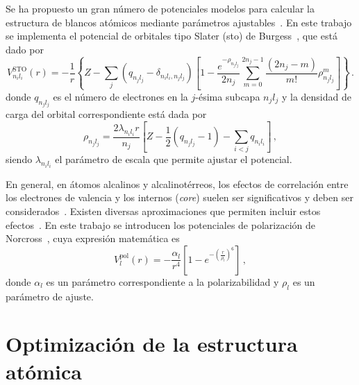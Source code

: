 Se ha propuesto un gran número de potenciales modelos para calcular la 
estructura de blancos atómicos mediante parámetros 
ajustables~\cite{Hibbert:82,Gombas:56,Green:69,Klapisch:71,Phillips:59,
Herman:63,Dalgarno:70,Bayliss:77,Cowan:76,Lee:77}. 
En este trabajo se implementa el potencial de orbitales tipo Slater 
(\acs{sto}) de Burgess~\cite{Burgess:89}, que está dado por
\begin{equation}
V_{n_il_i}^{\textrm{STO}}(r)=-\frac{1}{r}\left\{Z-\sum_j(q_{n_jl_j}-
\delta_{n_il_i,n_jl_j})
\left[1-\frac{e^{-\rho_{n_jl_j}}}{2n_j}\sum_{m=0}^{2n_j-1}
\frac{(2n_j-m)}{m!}\rho_{n_jl_j}^m\right]\right\}\,.
\label{eq:STO-pot}
\end{equation}
donde $q_{n_jl_j}$ es el número de electrones en la $j$-ésima subcapa 
$n_jl_j$ y la densidad de carga del orbital correspondiente está dada 
por
\begin{equation}
\rho_{n_jl_j}= \frac{2\lambda_{n_il_i}r}{n_j}\left[Z-
\frac{1}{2}\left(q_{n_jl_j}-1\right)-\sum_{i<j} q_{n_il_i}\right]\,,
\end{equation}
siendo $\lambda_{n_il_i}$ el parámetro de escala que permite ajustar el 
potencial. 

En general, en átomos alcalinos y alcalinotérreos, los efectos de 
correlación entre los electrones de valencia y los internos 
(\textit{core}) suelen ser significativos y deben ser 
considerados~\cite{Bartschat:04,Muller:83}. Existen diversas 
aproximaciones que permiten incluir estos efectos~\cite{Loughlin:88,
Seaton:72,Loughlin:73,Migdalek:78}. En este trabajo se introducen los
potenciales de polarización de Norcross~\cite{Norcross:76}, cuya 
expresión matemática es
\begin{equation}
 V_l^{\textrm{pol}}(r) = -\frac{\alpha_l}{r^4}\left[1-
e^{-\left(\tfrac{r}{\rho_l}\right)^6}\right]\,,
\label{eq:Norcross-pot}
\end{equation}
donde $\alpha_l$ es un parámetro correspondiente a la polarizabilidad y 
$\rho_l$ es un parámetro de ajuste.

\section{Optimización de la estructura atómica}
\label{sec:optproblems}


